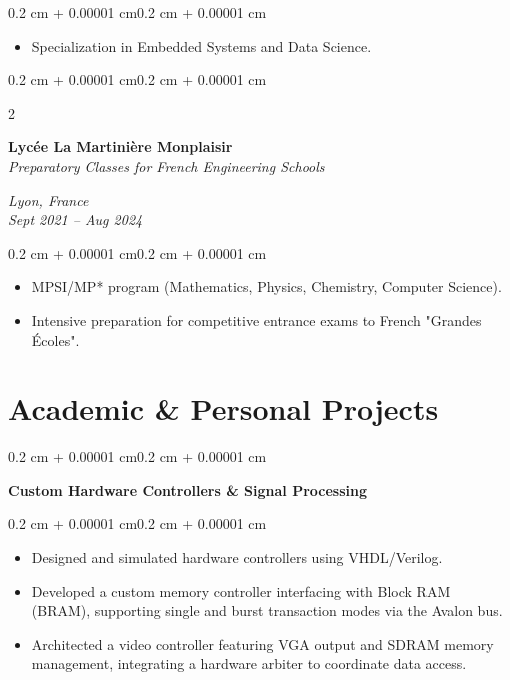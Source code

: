 \documentclass[10pt, a4paper]{article}
\newenvironment{highlights}{
    \begin{itemize}[
        topsep=0.10 cm,
        parsep=0.10 cm,
        partopsep=0pt,
        itemsep=0pt,
        leftmargin=0.4 cm + 10pt
    ]
}{
    \end{itemize}
}
\newenvironment{onecolentry}{
    \begin{adjustwidth}{0.2 cm + 0.00001 cm}{0.2 cm + 0.00001 cm}
}{
    \end{adjustwidth}
}
\newenvironment{twocolentry}[2][]{
    \onecolentry
    \def\secondColumn{#2}
    \setcolumnwidth{\fill, 4.5 cm}
    \begin{paracol}{2}
}{
    \switchcolumn \raggedleft \secondColumn
    \end{paracol}
    \endonecolentry
}
\begin{document}
        \vspace{0.10 cm}
        \begin{onecolentry}
            \begin{highlights}
                \item Specialization in Embedded Systems and Data Science.
            \end{highlights}
        \end{onecolentry}

        \begin{twocolentry}{
        \textit{Lyon, France} \\
        \textit{Sept 2021 – Aug 2024}}
            \textbf{Lycée La Martinière Monplaisir} \\
            \textit{Preparatory Classes for French Engineering Schools}
        \end{twocolentry}

        \vspace{0.10 cm}
        \begin{onecolentry}
            \begin{highlights}
                \item MPSI/MP* program (Mathematics, Physics, Chemistry,
                    Computer Science).
                \item Intensive preparation for competitive entrance exams to
                    French "Grandes Écoles".
            \end{highlights}
        \end{onecolentry}

    \section{Academic \& Personal Projects}

        \begin{onecolentry}
            \textbf{Custom Hardware Controllers \& Signal Processing}
        \end{onecolentry}
        \vspace{0.05 cm}
        \begin{onecolentry}
            \begin{highlights}
                \item Designed and simulated hardware controllers using
                    VHDL/Verilog.
                \item Developed a custom memory controller interfacing with
                    Block RAM (BRAM), supporting single and burst transaction
                    modes via the Avalon bus.
                \item Architected a video controller featuring VGA output and
                    SDRAM memory management, integrating a hardware arbiter to
                    coordinate data access.
            \end{highlights}
        \end{onecolentry}
        \vspace{0.2 cm}
\end{document}
